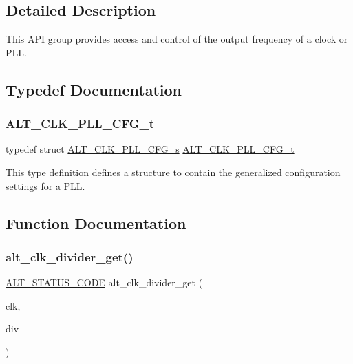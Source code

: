 \subsection{Detailed Description}
This A\+PI group provides access and control of the output frequency of a clock or P\+LL. 

\subsection{Typedef Documentation}
\mbox{\label{group__CLK__MGR__FREQ_ga4224be84fafb79818ab3736b39ad730a}} 
\subsubsection{\texorpdfstring{ALT\_CLK\_PLL\_CFG\_t}{ALT\_CLK\_PLL\_CFG\_t}}
{\footnotesize\ttfamily typedef struct \mbox{\hyperlink{structALT__CLK__PLL__CFG__s}{A\+L\+T\+\_\+\+C\+L\+K\+\_\+\+P\+L\+L\+\_\+\+C\+F\+G\+\_\+s}}  \mbox{\hyperlink{group__CLK__MGR__FREQ_ga4224be84fafb79818ab3736b39ad730a}{A\+L\+T\+\_\+\+C\+L\+K\+\_\+\+P\+L\+L\+\_\+\+C\+F\+G\+\_\+t}}}

This type definition defines a structure to contain the generalized configuration settings for a P\+LL. 

\subsection{Function Documentation}
\mbox{\label{group__CLK__MGR__FREQ_ga0ecbfb80ce5b08c0791495714c03572b}} 
\subsubsection{\texorpdfstring{alt\_clk\_divider\_get()}{alt\_clk\_divider\_get()}}
{\footnotesize\ttfamily \mbox{\hyperlink{hwlib_8h_abdb0d369f069723ca55d6c94bcaaaa12}{A\+L\+T\+\_\+\+S\+T\+A\+T\+U\+S\+\_\+\+C\+O\+DE}} alt\+\_\+clk\+\_\+divider\+\_\+get (\begin{DoxyParamCaption}\item[{\mbox{\hyperlink{group__CLK__MGR_ga4cdb80e84284365fe3d47c2f8050b13d}{A\+L\+T\+\_\+\+C\+L\+K\+\_\+t}}}]{clk,  }\item[{uint32\+\_\+t $\ast$}]{div }\end{DoxyParamCaption})}

